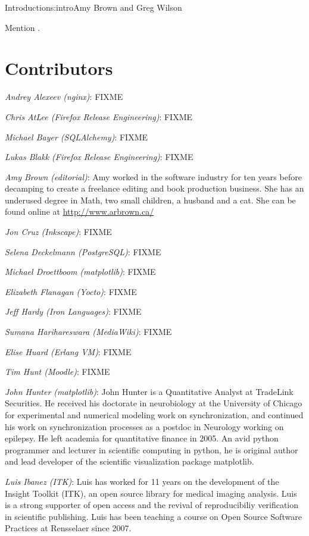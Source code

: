 \begin{aosachapter}{Introduction}{s:intro}{Amy Brown and Greg Wilson}

Mention \cite{bib:aosa1}.

\section*{Contributors}

\emph{Andrey Alexeev (nginx)}: FIXME

\emph{Chris AtLee (Firefox Release Engineering)}: FIXME

\emph{Michael Bayer (SQLAlchemy)}: FIXME

\emph{Lukas Blakk (Firefox Release Engineering)}: FIXME

\emph{Amy Brown (editorial)}: Amy worked in the software industry for
ten years before decamping to create a freelance editing and book production
business. She has an underused degree in Math, two small children, a
husband and a cat. She can be found online at \url{http://www.arbrown.ca/}

\emph{Jon Cruz (Inkscape)}: FIXME

\emph{Selena Deckelmann (PostgreSQL)}: FIXME

\emph{Michael Droettboom (matplotlib)}: FIXME

\emph{Elizabeth Flanagan (Yocto)}: FIXME

\emph{Jeff Hardy (Iron Languages)}: FIXME

\emph{Sumana Harihareswara (MediaWiki)}: FIXME

\emph{Elise Huard (Erlang VM)}: FIXME

\emph{Tim Hunt (Moodle)}: FIXME

\emph{John Hunter (matplotlib)}: John Hunter is a Quantitative Analyst
at TradeLink Securities.  He received his doctorate in neurobiology at
the University of Chicago for experimental and numerical modeling work
on synchronization, and continued his work on synchronization
processes as a postdoc in Neurology working on epilepsy. He left
academia for quantitative finance in 2005.  An avid python programmer
and lecturer in scientific computing in python, he is original author
and lead developer of the scientific visualization package matplotlib.

\emph{Luis Ibanez (ITK)}: Luis has worked for 11 years on the development of
the Insight Toolkit (ITK), an open source library for medical imaging analysis.
Luis is a strong supporter of open access and the revival of reproducibiliy
verification in scientific publishing. Luis has been teaching a course on Open
Source Software Practices at Rensselaer since 2007.


\end{aosachapter}
